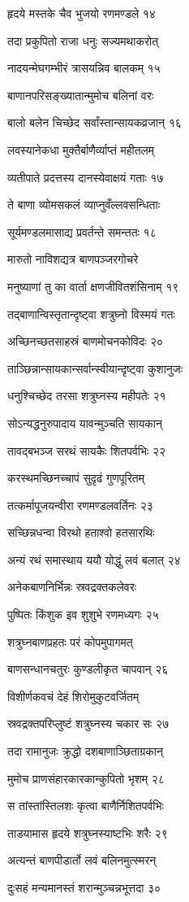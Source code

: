हृदये मस्तके चैव भुजयो रणमण्डले १४

तदा प्रकुपितो राजा धनुः सज्यमथाकरोत्

नादयन्मेघगम्भीरं त्रासयन्निव बालकम् १५

बाणानपरिसङ्ख्यातान्मुमोच बलिनां वरः

बालो बलेन चिच्छेद सर्वांस्तान्सायकव्रजान् १६

लवस्यानेकधा मुक्तैर्बाणैर्व्याप्तं महीतलम्

व्यतीपाते प्रदत्तस्य दानस्येवाक्षयं गताः १७

ते बाणा व्योमसकलं व्याप्नुवँल्लवसन्धिताः

सूर्यमण्डलमासाद्य प्रवर्तन्ते समन्ततः १८

मारुतो नाविशद्यत्र बाणपञ्जरगोचरे

मनुष्याणां तु का वार्ता क्षणजीवितशंसिनाम् १९

तद्बाणान्विस्तृतान्दृष्ट्वा शत्रुघ्नो विस्मयं गतः

अच्छिनच्छतसाहस्रं बाणमोचनकोविदः २०

ताञ्छिन्नान्सायकान्सर्वान्स्वीयान्दृष्ट्वा कुशानुजः

धनुश्चिच्छेद तरसा शत्रुघ्नस्य महीपतेः २१

सोऽन्यद्धनुरुपादाय यावन्मुञ्चति सायकान्

तावद्बभञ्ज सरथं सायकैः शितपर्वभिः २२

करस्थमच्छिनच्चापं सुदृढं गुणपूरितम्

तत्कर्मापूजयन्वीरा रणमण्डलवर्तिनः २३

सच्छिन्नधन्वा विरथो हताश्वो हतसारथिः

अन्यं रथं समास्थाय ययौ योद्धुं लवं बलात् २४

अनेकबाणनिर्भिन्नः स्रवद्रक्तकलेवरः

पुष्पितः किंशुक इव शुशुभे रणमध्यगः २५

शत्रुघ्नबाणप्रहतः परं कोपमुपागमत्

बाणसन्धानचतुरः कुण्डलीकृत चापवान् २६

विशीर्णकवचं देहं शिरोमुकुटवर्जितम्

स्रवद्रक्तपरिप्लुष्टं शत्रुघ्नस्य चकार सः २७

तदा रामानुजः क्रुद्धो दशबाणाञ्छिताग्रकान्

मुमोच प्राणसंहारकारकान्कुपितो भृशम् २८

स तांस्तांस्तिलशः कृत्वा बाणैर्निशितपर्वभिः

ताडयामास हृदये शत्रुघ्नस्याष्टभिः शरैः २९

अत्यन्तं बाणपीडार्तो लवं बलिनमुत्स्मरन्

दुःसहं मन्यमानस्तं शरान्मुञ्चन्नभूत्तदा ३०

